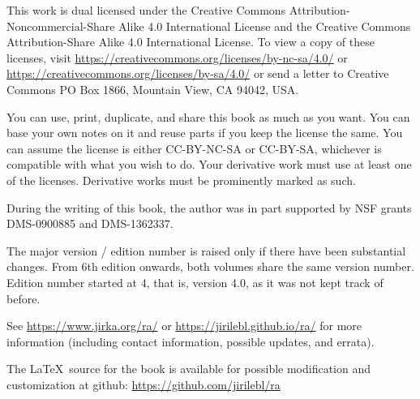 \documentclass[12pt]{book}
\newcommand{\ignore}[1]{}
\theoremstyle{plain}
\theoremstyle{remark}
\theoremstyle{definition}
\theoremstyle{exercise}
\theoremstyle{example}
\begin{document}
\bigskip

\noindent
This work
is dual licensed under
the Creative Commons
Attribution-Non\-commercial-Share Alike 4.0 International License and
the Creative Commons
Attribution-Share Alike 4.0 International License.
To view a
copy of these licenses, visit
\url{https://creativecommons.org/licenses/by-nc-sa/4.0/}
or
\url{https://creativecommons.org/licenses/by-sa/4.0/}
or send a letter to
Creative Commons
PO Box 1866, Mountain View, CA 94042, USA\@.

\bigskip

\noindent
You can use, print, duplicate, and share this book as much as you want.  You can
base your own notes on it and reuse parts if you keep the license the
same.  You can assume the license is either CC-BY-NC-SA or CC-BY-SA\@,
whichever is compatible with what you wish to do.
Your derivative work must use at least one of the licenses.
Derivative works must be prominently marked as such.

\bigskip

\noindent
During the writing of this book, 
the author was in part supported by NSF grants DMS-0900885 and
DMS-1362337.

\bigskip

\noindent
The major version / edition
number is raised only if there have been substantial changes.
From 6th edition onwards, both volumes share the same version number.
Edition
number started at 4, that is, version 4.0, as it was not kept track of
before.  %

\bigskip

\noindent
See \url{https://www.jirka.org/ra/} or \url{https://jirilebl.github.io/ra/} for more information
(including contact information, possible updates, and errata).


\bigskip

\noindent
The \LaTeX\ source for the book is available
for possible modification and customization
at github: \url{https://github.com/jirilebl/ra}



\tableofcontents
{}

\newpage

\end{document}
